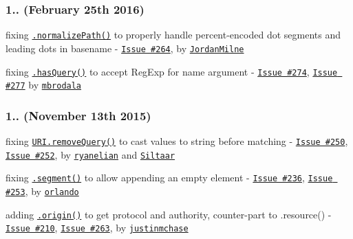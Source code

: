 \subsubsection*{1.. (February 25th 2016)}


\begin{DoxyItemize}
\item fixing \href{http://medialize.github.io/URI.js/docs.html#normalize-path}{\tt {\ttfamily .normalize\+Path()}} to properly handle percent-\/encoded dot segments and leading dots in basename -\/ \href{https://github.com/medialize/URI.js/issues/264}{\tt Issue \#264}, by \href{https://github.com/JordanMilne}{\tt Jordan\+Milne}
\item fixing \href{http://medialize.github.io/URI.js/docs.html#search-has}{\tt {\ttfamily .has\+Query()}} to accept {\ttfamily Reg\+Exp} for name argument -\/ \href{https://github.com/medialize/URI.js/issues/274}{\tt Issue \#274}, \href{https://github.com/medialize/URI.js/issues/277}{\tt Issue \#277} by \href{https://github.com/mbrodala}{\tt mbrodala}
\end{DoxyItemize}

\subsubsection*{1.. (November 13th 2015)}


\begin{DoxyItemize}
\item fixing \href{http://medialize.github.io/URI.js/docs.html#search-remove}{\tt {\ttfamily U\+R\+I.\+remove\+Query()}} to cast values to string before matching -\/ \href{https://github.com/medialize/URI.js/pull/250}{\tt Issue \#250}, \href{https://github.com/medialize/URI.js/pull/252}{\tt Issue \#252}, by \href{https://github.com/ryanelian}{\tt ryanelian} and \href{https://github.com/Siltaar}{\tt Siltaar}
\item fixing \href{http://medialize.github.io/URI.js/docs.html#accessors-segment}{\tt {\ttfamily .segment()}} to allow appending an empty element -\/ \href{https://github.com/medialize/URI.js/issues/236}{\tt Issue \#236}, \href{https://github.com/medialize/URI.js/pull/253}{\tt Issue \#253}, by \href{https://github.com/orlando}{\tt orlando}
\item adding \href{http://medialize.github.io/URI.js/docs.html#accessors-origin}{\tt {\ttfamily .origin()}} to get protocol and authority, counter-\/part to {\ttfamily .resource()} -\/ \href{https://github.com/medialize/URI.js/issues/210}{\tt Issue \#210}, \href{https://github.com/medialize/URI.js/pull/263}{\tt Issue \#263}, by \href{https://github.com/justinmchase}{\tt justinmchase}
\end{DoxyItemize}

